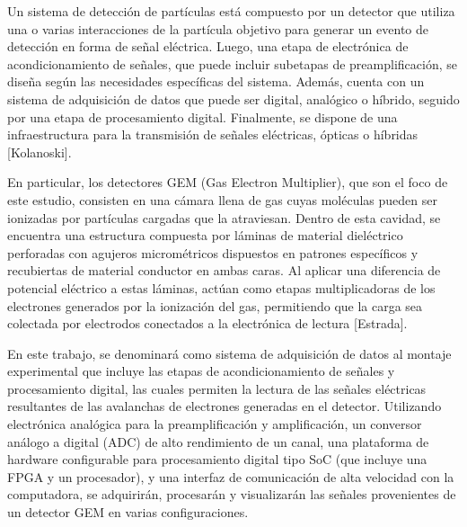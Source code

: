 \documentclass[]{book}
\begin{document}
\noindent Un sistema de detección de partículas está compuesto por un detector que utiliza una o varias interacciones de la partícula objetivo para generar un evento de detección en forma de señal eléctrica. Luego, una etapa de electrónica de acondicionamiento de señales, que puede incluir subetapas de preamplificación, se diseña según las necesidades específicas del sistema. Además, cuenta con un sistema de adquisición de datos que puede ser digital, analógico o híbrido, seguido por una etapa de procesamiento digital. Finalmente, se dispone de una infraestructura para la transmisión de señales eléctricas, ópticas o híbridas [Kolanoski].

\noindent En particular, los detectores GEM (Gas Electron Multiplier), que son el foco de este estudio, consisten en una cámara llena de gas cuyas moléculas pueden ser ionizadas por partículas cargadas que la atraviesan. Dentro de esta cavidad, se encuentra una estructura compuesta por láminas de material dieléctrico perforadas con agujeros micrométricos dispuestos en patrones específicos y recubiertas de material conductor en ambas caras. Al aplicar una diferencia de potencial eléctrico a estas láminas, actúan como etapas multiplicadoras de los electrones generados por la ionización del gas, permitiendo que la carga sea colectada por electrodos conectados a la electrónica de lectura [Estrada].

\noindent En este trabajo, se denominará como sistema de adquisición de datos al montaje experimental que incluye las etapas de acondicionamiento de señales y procesamiento digital, las cuales permiten la lectura de las señales eléctricas resultantes de las avalanchas de electrones generadas en el detector. Utilizando electrónica analógica para la preamplificación y amplificación, un conversor análogo a digital (ADC) de alto rendimiento de un canal, una plataforma de hardware configurable para procesamiento digital tipo SoC (que incluye una FPGA y un procesador), y una interfaz de comunicación de alta velocidad con la computadora, se adquirirán, procesarán y visualizarán las señales provenientes de un detector GEM en varias configuraciones.
\end{document}

